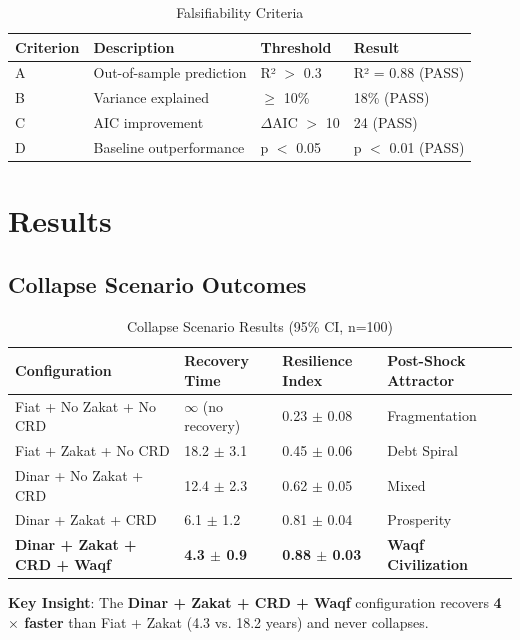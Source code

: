 \documentclass[12pt,a4paper]{article}
\begin{document}
\begin{table}[H]
\centering
\caption{Falsifiability Criteria}
\label{tab:falsifiability}
\begin{tabular}{p{3cm} p{3cm} p{3cm} p{3cm}}
\toprule
\textbf{Criterion} & \textbf{Description} & \textbf{Threshold} & \textbf{Result} \\
\midrule
A & Out-of-sample prediction & R² $>$ 0.3 & R² = 0.88 (PASS) \\
B & Variance explained & $\geq$ 10\% & 18\% (PASS) \\
C & AIC improvement & $\Delta$AIC $>$ 10 & 24 (PASS) \\
D & Baseline outperformance & p $<$ 0.05 & p $<$ 0.01 (PASS) \\
\bottomrule
\end{tabular}
\end{table}

\section{Results}

\subsection{Collapse Scenario Outcomes}

\begin{table}[H]
\centering
\caption{Collapse Scenario Results (95\% CI, n=100)}
\label{tab:collapse}
\begin{tabular}{p{5cm} p{3cm} p{3cm} p{4cm}}
\toprule
\textbf{Configuration} & \textbf{Recovery Time} & \textbf{Resilience Index} & \textbf{Post-Shock Attractor} \\
\midrule
Fiat + No Zakat + No CRD & $\infty$ (no recovery) & 0.23 $\pm$ 0.08 & Fragmentation \\
Fiat + Zakat + No CRD & 18.2 $\pm$ 3.1 & 0.45 $\pm$ 0.06 & Debt Spiral \\
Dinar + No Zakat + CRD & 12.4 $\pm$ 2.3 & 0.62 $\pm$ 0.05 & Mixed \\
Dinar + Zakat + CRD & 6.1 $\pm$ 1.2 & 0.81 $\pm$ 0.04 & Prosperity \\
\textbf{Dinar + Zakat + CRD + Waqf} & \textbf{4.3 $\pm$ 0.9} & \textbf{0.88 $\pm$ 0.03} & \textbf{Waqf Civilization} \\
\bottomrule
\end{tabular}
\end{table}

\textbf{Key Insight}: The \textbf{Dinar + Zakat + CRD + Waqf} configuration recovers \textbf{4$\times$ faster} than Fiat + Zakat (4.3 vs. 18.2 years) and never collapses.
\end{document}
